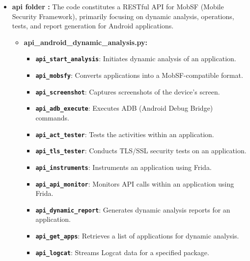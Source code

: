 \documentclass{report}
\begin{document}
\begin{itemize}
\begin{itemize}
        \item \textbf\textbf{api folder :}
        The code constitutes a RESTful API for MobSF (Mobile Security Framework), primarily focusing on dynamic analysis, operations, tests, and report generation for Android applications.
        \begin{itemize}
          \item \textbf{api\_android\_dynamic\_analysis.py:}
          \begin{itemize}
                        
            \item \textbf \texttt{api\_start\_analysis}: Initiates dynamic analysis of an application.
            
            \item \textbf \texttt{api\_mobsfy}: Converts applications into a MobSF-compatible format.
            
            \item \textbf \texttt{api\_screenshot}: Captures screenshots of the device's screen.
            
            \item \textbf \texttt{api\_adb\_execute}: Executes ADB (Android Debug Bridge) commands.
            
            \item \textbf \texttt{api\_act\_tester}: Tests the activities within an application.
            
            \item \textbf \texttt{api\_tls\_tester}: Conducts TLS/SSL security tests on an application.
            
            \item \textbf \texttt{api\_instruments}: Instruments an application using Frida.
            
            \item \textbf \texttt{api\_api\_monitor}: Monitors API calls within an application using Frida.
            
            \item \textbf \texttt{api\_dynamic\_report}: Generates dynamic analysis reports for an application.
            
            \item \textbf \texttt{api\_get\_apps}: Retrieves a list of applications for dynamic analysis.

            \item \textbf \texttt{api\_logcat}: Streams Logcat data for a specified package.
            

\end{itemize}
\end{itemize}
\end{itemize}
\end{itemize}
\end{document}
